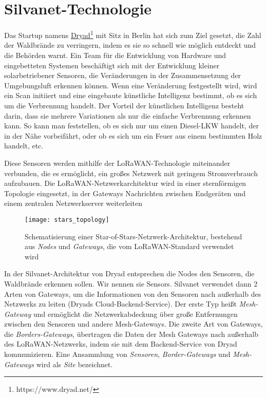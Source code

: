 \section{Silvanet-Technologie}

Das Startup namens \href{https://www.dryad.net/}{Dryad}\footnote{https://www.dryad.net/} mit Sitz in Berlin hat sich zum Ziel gesetzt, die Zahl der Waldbrände zu verringern, indem es sie so schnell wie möglich entdeckt und die Behörden warnt.
Ein Team für die Entwicklung von Hardware und eingebetteten Systemen beschäftigt sich mit der Entwicklung kleiner solarbetriebener Sensoren, die Veränderungen in der Zusammensetzung der Umgebungsluft erkennen können.
Wenn eine Veränderung festgestellt wird, wird ein Scan initiiert und eine eingebaute künstliche Intelligenz bestimmt, ob es sich um die Verbrennung handelt.
Der Vorteil der künstlichen Intelligenz besteht darin, dass sie mehrere Variationen als nur die einfache Verbrennung erkennen kann. So kann man feststellen, ob es sich nur um einen Diesel-LKW handelt, der in der Nähe vorbeifährt, oder ob es sich um ein Feuer aus einem bestimmten Holz handelt, etc.

Diese Sensoren werden mithilfe der LoRaWAN-Technologie miteinander verbunden, die es ermöglicht, ein großes Netzwerk mit geringem Stromverbrauch aufzubauen.
Die LoRaWAN-Netzwerkarchitektur wird in einer sternförmigen Topologie eingesetzt, in der Gateways Nachrichten zwischen Endgeräten und einem zentralen Netzwerkserver weiterleiten

\begin{figure}[h]
  \centering
  \texttt{[image: stars\_topology]}
  \caption{Schematisierung einer Star-of-Stars-Netzwerk-Architektur, bestehend aus \textit{Nodes} und \textit{Gateways}, die vom LoRaWAN-Standard verwendet wird\cite{phdthesisLoRA}}
\end{figure}

In der Silvanet-Architektur von Dryad entsprechen die Nodes den Sensoren, die Waldbrände erkennen sollen. Wir nennen sie Sensors.
Silvanet verwendet dann 2 Arten von Gateways, um die Informationen von den Sensoren nach außerhalb des Netzwerks zu leiten (Dryads Cloud-Backend-Service).
Der erste Typ heißt \textit{Mesh-Gateway} und ermöglicht die Netzwerkabdeckung über große Entfernungen zwischen den Sensoren und andere Mesh-Gateways.
Die zweite Art von Gateways, die \textit{Borders-Gateways}, übertragen die Daten der Mesh Gateways nach außerhalb des LoRaWAN-Netzwerks, indem sie mit dem Backend-Service von Dryad kommunizieren.
Eine Ansammlung von \textit{Sensoren}, \textit{Border-Gateways} und \textit{Mesh-Gateways} wird als \textit{Site} bezeichnet.

